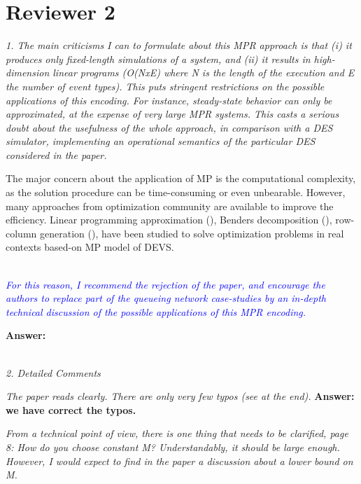 \documentclass[suppldata]{interact}
\begin{document}
\section{Reviewer 2}

\textit{1. The main criticisms I can to formulate about this MPR approach is that
(i) it produces only fixed-length simulations of a system, and (ii) it
results in high-dimension linear programs (O(NxE) where N is the
length of the execution and E the number of event types). This puts
stringent restrictions on the possible applications of this
encoding. For instance, steady-state behavior can only be
approximated, at the expense of very large MPR systems. This casts a
serious doubt about the usefulness of the whole approach, in
comparison with a DES simulator, implementing an operational
semantics of the particular DES considered in the paper.}


The major concern about the application of MP is the computational complexity, %
as the solution procedure can be time-consuming or even unbearable. However, many approaches from optimization community are available to improve the efficiency. Linear programming approximation (\cite{alfieri2012mathematical}), Benders decomposition (\cite{weiss2015buffer}), row-column generation (\cite{alfieri2020time}), have been studied to solve optimization problems in %
real contexts based-on MP model of DEVS.

~\\

\textit{\textcolor{blue}{For this reason, I recommend the rejection of the paper, and encourage the authors to replace part of the queueing network case-studies by an in-depth technical discussion of the possible applications of this MPR encoding.}}

\noindent
\textbf{Answer:}

~\\

\textit{2. Detailed Comments}


\textit{The paper reads clearly. There are only very few typos (see at the end).}
\textbf{Answer: we have correct the typos.}



\textit{From a technical point of view, there is one thing that needs to be clarified, page 8: How do you choose constant M? Understandably, it should be large enough. However, I would expect to find in the paper a discussion about a lower bound on M.}
\end{document}
